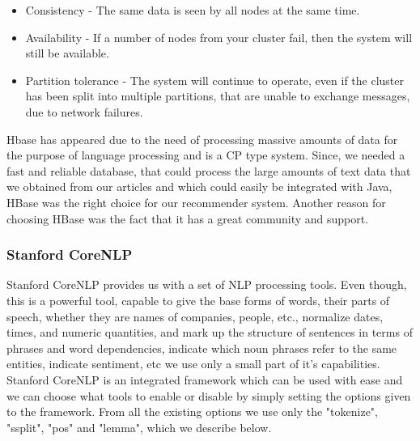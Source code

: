 \begin{itemize}
	\item Consistency - The same data is seen by all nodes at the same time.
	\item Availability - If a number of nodes from your cluster fail, then the system will still be available.
	\item Partition tolerance - The system will continue to operate, even if the cluster has been split into multiple partitions, that are unable to exchange messages, due to network failures.
\end{itemize}

Hbase has appeared due to the need of processing massive amounts of data for the purpose of language processing and is a CP type system. 
Since, we needed a fast and reliable database, that could process the large amounts of text data that we obtained from our articles and which could easily be integrated with Java, HBase was the right choice for our recommender system. Another reason for choosing HBase was the fact that it has a great community and support. 

\subsubsection{Stanford CoreNLP}
\label{sec:frameworks-stanford-corenlp}
Stanford CoreNLP\cite{manning-EtAl:2014:P14-5} provides us with a set of NLP processing tools. Even though, this is a powerful tool, capable to give the base forms of words, their parts of speech, whether they are names of companies, people, etc., normalize dates, times, and numeric quantities, and mark up the structure of sentences in terms of phrases and word dependencies, indicate which noun phrases refer to the same entities, indicate sentiment, etc we use only a small part of it's capabilities.
Stanford CoreNLP is an integrated framework which can be used with ease and we can choose what tools to enable or disable by simply setting the options given to the framework. 
From all the existing options we use only the "tokenize", "ssplit", "pos" and "lemma", which we describe below.

